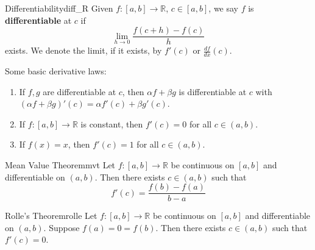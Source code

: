 \documentclass[11pt, letterpaper, openany]{book}
\begin{document}
\begin{defn}{Differentiability}{diff_R}
Given $f:[a,b]\to\mathbb{R}$, $c\in[a,b]$, we say $f$ is \textbf{differentiable} at $c$ if 
\[\lim_{h\to0}\frac{f(c+h)-f(c)}{h}\]
exists. We denote the limit, if it exists, by $f'(c)$ or $\frac{df}{dx}(c)$.
\end{defn}

\begin{remark}
Some basic derivative laws:
\begin{enumerate}
    \item If $f,g$ are differentiable at $c$, then $\alpha f + \beta g$ is differentiable at $c$ with $(\alpha f + \beta g)'(c) = \alpha f'(c) + \beta g'(c)$.
    \item If $f:[a,b]\to\mathbb{R}$ is constant, then $f'(c) = 0$ for all $c \in (a,b)$.
    \item If $f(x) = x$, then $f'(c) = 1$ for all $c \in (a,b)$.
\end{enumerate}
\end{remark}

\begin{thm}{Mean Value Theorem}{mvt}
Let $f:[a,b]\to\mathbb{R}$ be continuous on $[a,b]$ and differentiable on $(a,b)$. Then there exists $c \in (a,b)$ such that
\[f'(c) = \frac{f(b) - f(a)}{b - a}\]
\end{thm}

\begin{thm}{Rolle's Theorem}{rolle}
Let $f:[a,b]\to\mathbb{R}$ be continuous on $[a,b]$ and differentiable on $(a,b)$. Suppose $f(a) = 0 = f(b)$. Then there exists $c \in (a,b)$ such that $f'(c) = 0$.
\end{thm}
\end{document}
